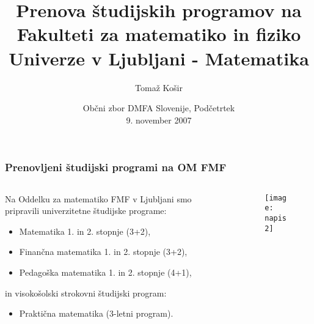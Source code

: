 \documentclass{beamer}
\title[] %
{Prenova \v studijskih programov na Fakulteti za matematiko in fiziko Univerze v Ljubljani - Matematika}
\author[T. Ko\v sir] %
{Toma\v z Ko\v sir%
}
\date[9. november 2007] %
{Ob\v cni zbor DMFA Slovenije, Pod\v cetrtek\\ 9. november  2007}
\begin{document}
\begin{frame}
  \titlepage
\end{frame}







\begin{frame}
  \frametitle{Prenovljeni \v studijski programi na OM FMF}

\begin{columns}
\begin{column}{5.7cm}
Na Oddelku za matematiko FMF v Ljubljani smo pripravili univerzitetne \v studijske programe:
\begin{itemize}

\item \alert{Matematika} 1. in 2. stopnje (3+2),\pause
\item \alert{Finan\v cna matematika} 1. in 2. stopnje (3+2),\pause
\item \alert{Pedago\v ska matematika} 1. in 2. stopnje (4+1),\pause
\end{itemize}
in visoko\v solski strokovni \v studijski program:
\begin{itemize}
\item \alert{Prakti\v cna matematika} (3-letni program).
\end{itemize}
\end{column}
\begin{column}{5.3cm}
\begin{figure}


{\texttt{[image: napis2]} }
\end{figure}
\end{column}
\end{columns}

\end{frame}
\end{document}
